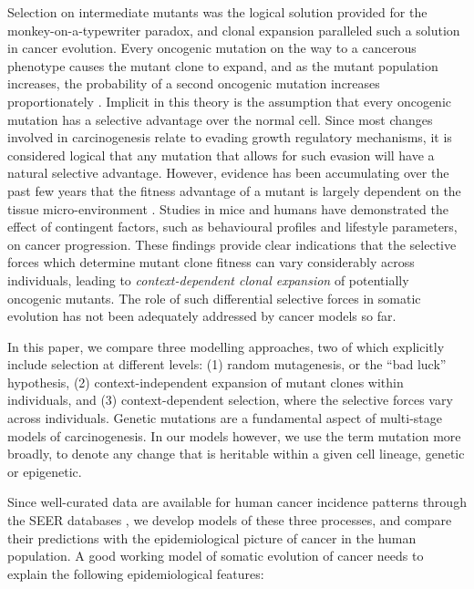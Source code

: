 \documentclass[12pt,onecolumn,twoside]{article}
\begin{document}
Selection on intermediate mutants was the logical solution provided for the monkey-on-a-typewriter paradox, and clonal expansion paralleled such a solution in cancer evolution. Every oncogenic mutation on the way to a cancerous phenotype causes the mutant clone to expand, and as the mutant population increases, the probability of a second oncogenic mutation increases proportionately \autocite{Nowell1976}. Implicit in this theory is the assumption that every oncogenic mutation has a selective advantage over the normal cell. Since most changes involved in carcinogenesis relate to evading growth regulatory mechanisms, it is considered logical that any mutation that allows for such evasion will have a natural selective advantage. However, evidence has been accumulating over the past few years that the fitness advantage of a mutant is largely dependent on the tissue micro-environment \autocite{Hanahan2012, Pietras2010}. Studies in mice \autocite{Cao2010} and humans \autocite{Rundqvist2013} have demonstrated the effect of contingent factors, such as behavioural profiles and lifestyle parameters, on cancer progression. These findings provide clear indications that the selective forces which determine mutant clone fitness can vary considerably across individuals, leading to \textit{context-dependent clonal expansion} of potentially oncogenic mutants. The role of such differential selective forces in somatic evolution has not been adequately addressed by cancer models so far.

In this paper, we compare three modelling approaches, two of which explicitly include selection at different levels: (1) random mutagenesis, or the ``bad luck'' hypothesis, (2) context-independent expansion of mutant clones within individuals, and (3) context-dependent selection, where the selective forces vary across individuals. Genetic mutations are a fundamental aspect of multi-stage models of carcinogenesis. In our models however, we use the term mutation more broadly, to denote any change that is heritable within a given cell lineage, genetic or epigenetic.

Since well-curated data are available for human cancer incidence patterns through the SEER databases \autocite{AmericanCancerSociety2016}, we develop models of these three processes, and compare their predictions with the epidemiological picture of cancer in the human population. A good working model of somatic evolution of cancer needs to explain the following epidemiological features:
\end{document}
